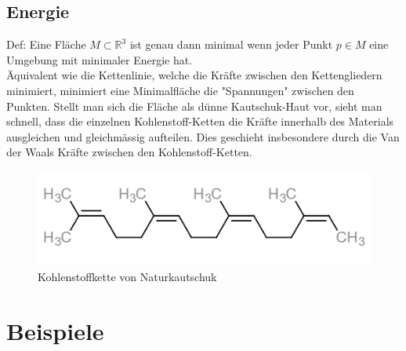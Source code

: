 \begin{refsection}
\subsection{Energie}\label{Energie}
Def: Eine Fläche $M\subset\mathbb{R}^{3}$ ist genau dann minimal wenn jeder Punkt $p \in M$ eine Umgebung mit minimaler Energie hat.\\
Äquivalent wie die Kettenlinie, welche die Kräfte zwischen den Kettengliedern minimiert, minimiert eine Minimalfläche die "Spannungen" zwischen den Punkten. Stellt man sich die Fläche als dünne Kautschuk-Haut vor, sieht man schnell, dass die einzelnen Kohlenstoff-Ketten die Kräfte innerhalb des Materials ausgleichen und gleichmässig aufteilen. Dies geschieht insbesondere durch die Van der Waals Kräfte zwischen den Kohlenstoff-Ketten.

\begin{figure}[H]
  \centering
  \includegraphics[scale=1]{minimal/cis-Polyisopren.PNG}
  \caption{Kohlenstoffkette von Naturkautschuk} 
\end{figure}


\section{Beispiele}

\end{refsection}
